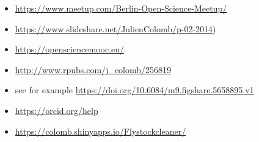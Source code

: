 \begin{multicols}{2}

\begin{itemize}[noitemsep]

\item [1] \url{https://www.meetup.com/Berlin-Open-Science-Meetup/}
\item [2]  \url{https://www.slideshare.net/JulienColomb/p-02-2014})
\item [3] \url{https://opensciencemooc.eu/}
\item [4] \url{http://www.rpubs.com/j_colomb/256819}
\item [5] see for example \url{https://doi.org/10.6084/m9.figshare.5658895.v1}
\item [6]\url{ https://orcid.org/help}
\item [7] \url{https://colomb.shinyapps.io/Flystockcleaner/}


\end{itemize}
\end{multicols}
\newpage 

